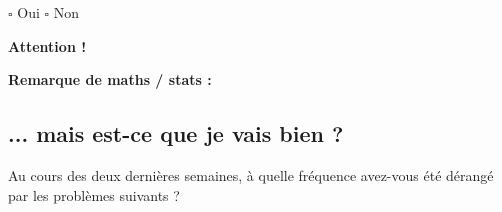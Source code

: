 $\square$ Oui \hspace{1cm} $\square$ Non \\
\Pointilles[4]


\textbf{Attention !} \\
\Pointilles[4]

\textbf{Remarque de maths / stats :} \\
\Pointilles[4]

\newpage
\subsection{... mais est-ce que je vais bien ?} 

Au cours des deux dernières semaines, à quelle fréquence avez-vous été dérangé par les problèmes suivants ? \\


